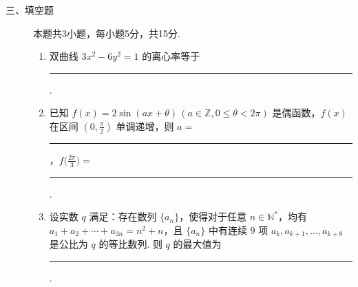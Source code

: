 \begin{description}
    \item[三、填空题] 本题共3小题，每小题5分，共15分. 
    \begin{enumerate}[leftmargin=5pt]
              \addtocounter{enumi}{+11}   
        \item 双曲线 $3x^2-6y^2=1$ 的离心率等于 \rule[-0.3ex]{3em}{0.4pt}. 
        \item 已知 $f(x)=2\sin(ax+\theta)\,(a\in\mathbb{Z},0\leqslant\theta<2\pi)$ 是偶函数，$f(x)$ 在区间 $(0,\frac{\pi}{2})$ 单调递增，则 $a=$ \rule[-0.3ex]{3em}{0.4pt}，$f\bigl(\frac{2\pi}{3}\bigr)=$ \rule[-0.3ex]{3em}{0.4pt}. 
        \item 设实数 $q$ 满足：存在数列 $\{a_n\}$，使得对于任意 $n\in\mathbb{N}^*$，均有 $a_1+a_2+\cdots+a_{3n}=n^2+n$，且 $\{a_n\}$ 中有连续 $9$ 项 $a_k,a_{k+1},\dots,a_{k+8}$ 是公比为 $q$ 的等比数列. 则 $q$ 的最大值为 \rule[-0.3ex]{3em}{0.4pt}. 
    \end{enumerate}
\end{description}

